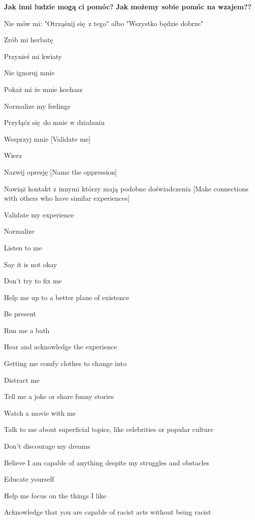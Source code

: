 \noindent\textcolor{ProcessBlue}{\textbf{\Large{Jak inni ludzie mogą ci pomóc?}}}
\noindent\textcolor{ProcessBlue}{\textbf{\Large{Jak możemy sobie pomóc na wzajem??}}}\\
\begin{multicols}{2}
\begin{checkboxlist}
\item Nie mów mi: "Otrząśnij się z tego" albo "Wszystko będzie dobrze"
\item Zrób mi herbatę
\item Przynieś mi kwiaty
\item Nie ignoruj mnie
\item Pokaż mi że mnie kochasz
\item Normalize my feelings
\item Przyłąćz się do mnie w działaniu
\item Wesprzyj mnie [Validate me]
\item Wierz
\item Nazwij opresję [Name the oppression]
\item Nawiąż kontakt z innymi którzy mają podobne doświadczenia [Make connections with others who have similar experiences]
\item Validate my experience
\item Normalize
\item Listen to me
\item Say it is not okay
\item Don’t try to fix me
\item Help me up to a better plane of existence
\item Be present
\item Run me a bath
\item Hear and acknowledge the experience
\item Getting me comfy clothes to change into
\item Distract me
\item Tell me a joke or share funny stories
\item Watch a movie with me
\item Talk to me about superficial topics, like celebrities or popular culture
\item Don’t discourage my dreams
\item Believe I am capable of anything despite my struggles and obstacles
\item Educate yourself
\item Help me focus on the things I like
\item Acknowledge that you are capable of racist acts without being racist

\end{checkboxlist}
\end{multicols}

